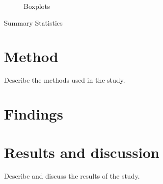 \documentclass[12pt,a4paper,english]{article}
\begin{document}
\begin{figure}[htbp]
	\centering
	
	\caption{Boxplots}
\end{figure}



\begin{table}[H]
    \centering
	
	\caption{Summary Statistics}
\end{table}

\section{Method}
Describe the methods used in the study.

\section{Findings}

\begin{figure}[htbp]
	\centering
	
	\caption{}
\end{figure}

\begin{figure}[htbp]
	\centering
	
	\caption{}
\end{figure}

\begin{figure}[htbp]
	\centering
	
	\caption{}
\end{figure}


\section{Results and discussion}
Describe and discuss the results of the study.


\theendnotes



\end{document}
